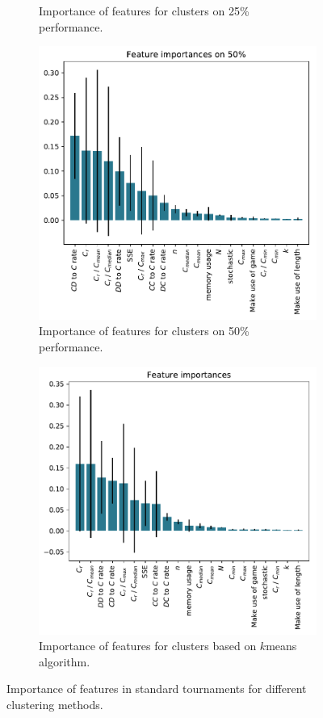 \documentclass{article}
\begin{document}
\begin{figure}[!htbp]
\begin{subfigure}[t]{0.5\textwidth}
\begin{center}
        \end{center}
        \caption{Importance of features for clusters on 25\% performance.}
    \end{subfigure}
    \begin{subfigure}[t]{0.5\textwidth}
        \begin{center}
            \includegraphics[width=.75\linewidth]{../new_output/standard/_feature_importance_bar_plot_cluster_on_0_5.pdf}
        \end{center}
        \caption{Importance of features for clusters on 50\% performance.}
    \end{subfigure}\hfill
    \begin{subfigure}[t]{0.5\textwidth}
        \begin{center}
            \includegraphics[width=.75\linewidth]{../k_means_output/standard/_feature_importance_bar_plot.pdf}
        \end{center}
        \caption{Importance of features for clusters based on \(k\)means algorithm.}
    \end{subfigure}
    \caption{Importance of features in standard tournaments for different
    clustering methods.}\label{fig:clustering_importance_standard}
\end{figure}
\end{document}
